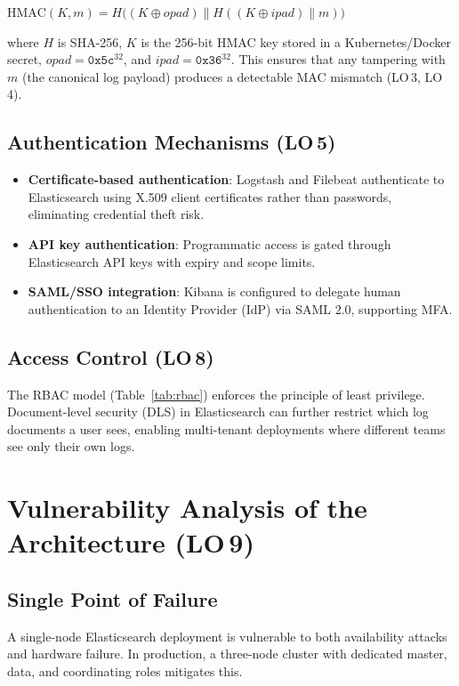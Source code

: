 \documentclass[12pt,a4paper]{report}
\begin{document}
$\text{HMAC}(K, m) = H\bigl((K \oplus opad) \| H((K \oplus ipad) \| m)\bigr)$

where $H$ is SHA-256, $K$ is the 256-bit HMAC key stored in a Kubernetes/Docker secret,
$opad = \texttt{0x5c}^{32}$, and $ipad = \texttt{0x36}^{32}$.
This ensures that any tampering with $m$ (the canonical log payload) produces a
detectable MAC mismatch (LO\,3, LO\,4).

\subsection{Authentication Mechanisms (LO\,5)}

\begin{itemize}[leftmargin=1.5em]
    \item \textbf{Certificate-based authentication}: Logstash and Filebeat authenticate
          to Elasticsearch using X.509 client certificates rather than passwords,
          eliminating credential theft risk.
    \item \textbf{API key authentication}: Programmatic access is gated through
          Elasticsearch API keys with expiry and scope limits.
    \item \textbf{SAML/SSO integration}: Kibana is configured to delegate human
          authentication to an Identity Provider (IdP) via SAML 2.0, supporting MFA.
\end{itemize}

\subsection{Access Control (LO\,8)}

The RBAC model (Table~\ref{tab:rbac}) enforces the principle of least privilege.
Document-level security (DLS) in Elasticsearch can further restrict which log documents
a user sees, enabling multi-tenant deployments where different teams see only their own logs.

\section{Vulnerability Analysis of the Architecture (LO\,9)}

\subsection{Single Point of Failure}

A single-node Elasticsearch deployment is vulnerable to both availability attacks and
hardware failure.
In production, a three-node cluster with dedicated master, data, and coordinating roles
mitigates this.
\end{document}
